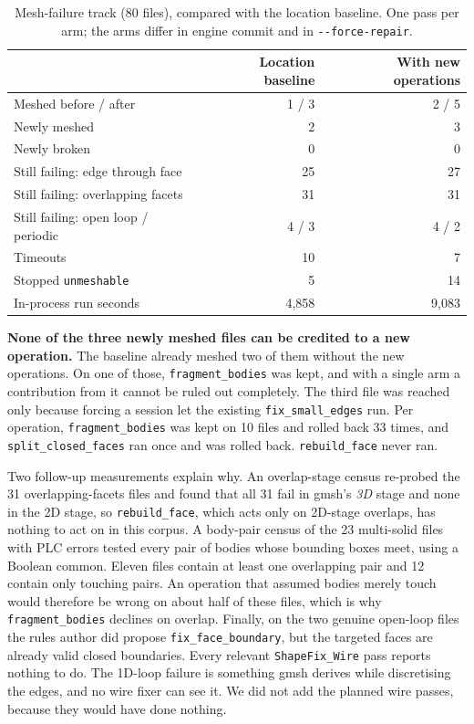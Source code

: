 \documentclass[11pt,onecolumn]{article}
\newcommand{\code}[1]{\texttt{\small #1}}
\begin{document}
\begin{table}[t]
\centering
\caption{Mesh-failure track (80 files), compared with the location baseline. One pass per arm; the
arms differ in engine commit and in \code{-{}-force-repair}.}
\label{tab:meshops}
\small
\begin{tabularx}{\textwidth}{@{}X r r@{}}
\toprule
 & \textbf{Location baseline} & \textbf{With new operations}\\
\midrule
Meshed before / after              & 1 / 3  & 2 / 5\\
Newly meshed                       & 2      & 3\\
Newly broken                       & 0      & 0\\
Still failing: edge through face   & 25     & 27\\
Still failing: overlapping facets  & 31     & 31\\
Still failing: open loop / periodic& 4 / 3  & 4 / 2\\
Timeouts                           & 10     & 7\\
Stopped \code{unmeshable}          & 5      & 14\\
In-process run seconds             & 4,858  & 9,083\\
\bottomrule
\end{tabularx}
\end{table}

\textbf{None of the three newly meshed files can be credited to a new operation.} The baseline
already meshed two of them without the new operations. On one of those, \code{fragment\_bodies} was
kept, and with a single arm a contribution from it cannot be ruled out completely. The third file
was reached only because forcing a session let the existing \code{fix\_small\_edges} run. Per
operation, \code{fragment\_bodies} was kept on 10 files and rolled back 33 times, and
\code{split\_closed\_faces} ran once and was rolled back. \code{rebuild\_face} never ran.

Two follow-up measurements explain why. An overlap-stage census re-probed the 31 overlapping-facets
files and found that all 31 fail in gmsh's \emph{3D} stage and none in the 2D stage, so
\code{rebuild\_face}, which acts only on 2D-stage overlaps, has nothing to act on in this corpus. A
body-pair census of the 23 multi-solid files with PLC errors tested every pair of bodies whose
bounding boxes meet, using a Boolean common. Eleven files contain at least one overlapping pair and
12 contain only touching pairs. An operation that assumed bodies merely touch would therefore be
wrong on about half of these files, which is why \code{fragment\_bodies} declines on overlap.
Finally, on the two genuine open-loop files the rules author did propose \code{fix\_face\_boundary},
but the targeted faces are already valid closed boundaries. Every relevant \code{ShapeFix\_Wire}
pass reports nothing to do. The 1D-loop failure is something gmsh derives while discretising the
edges, and no wire fixer can see it. We did not add the planned wire passes, because they would have
done nothing.
\end{document}
